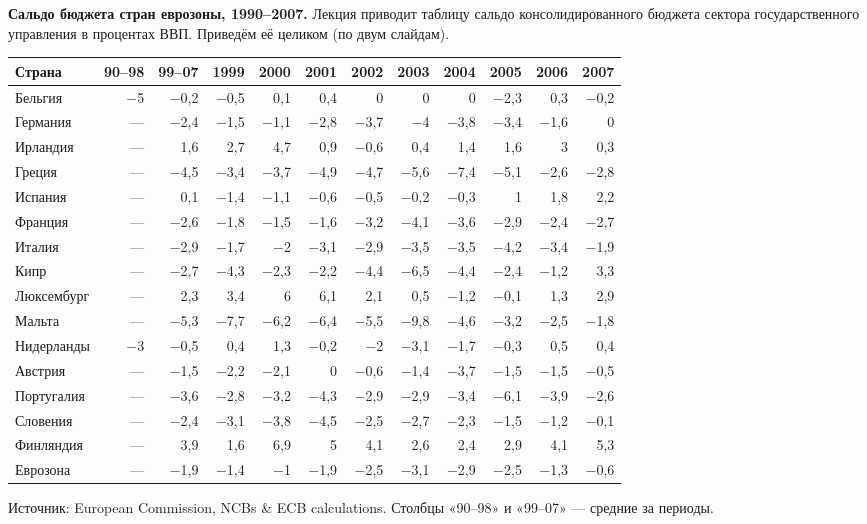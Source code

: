 \documentclass[11pt,a4paper]{article}
\begin{document}
\textbf{Сальдо бюджета стран еврозоны, 1990--2007.} Лекция приводит таблицу сальдо консолидированного бюджета сектора государственного управления в процентах ВВП. Приведём её целиком (по двум слайдам).

\begin{center}
\footnotesize
\setlength{\tabcolsep}{3.2pt}
\begin{tabular}{lrrrrrrrrrrr}
\toprule
\textbf{Страна} & \textbf{90--98} & \textbf{99--07} & \textbf{1999} & \textbf{2000} & \textbf{2001} & \textbf{2002} & \textbf{2003} & \textbf{2004} & \textbf{2005} & \textbf{2006} & \textbf{2007}\\
\midrule
Бельгия & −5 & −0,2 & −0,5 & 0,1 & 0,4 & 0 & 0 & 0 & −2,3 & 0,3 & −0,2\\
Германия & --- & −2,4 & −1,5 & −1,1 & −2,8 & −3,7 & −4 & −3,8 & −3,4 & −1,6 & 0\\
Ирландия & --- & 1,6 & 2,7 & 4,7 & 0,9 & −0,6 & 0,4 & 1,4 & 1,6 & 3 & 0,3\\
Греция & --- & −4,5 & −3,4 & −3,7 & −4,9 & −4,7 & −5,6 & −7,4 & −5,1 & −2,6 & −2,8\\
Испания & --- & 0,1 & −1,4 & −1,1 & −0,6 & −0,5 & −0,2 & −0,3 & 1 & 1,8 & 2,2\\
Франция & --- & −2,6 & −1,8 & −1,5 & −1,6 & −3,2 & −4,1 & −3,6 & −2,9 & −2,4 & −2,7\\
Италия & --- & −2,9 & −1,7 & −2 & −3,1 & −2,9 & −3,5 & −3,5 & −4,2 & −3,4 & −1,9\\
Кипр & --- & −2,7 & −4,3 & −2,3 & −2,2 & −4,4 & −6,5 & −4,4 & −2,4 & −1,2 & 3,3\\
Люксембург & --- & 2,3 & 3,4 & 6 & 6,1 & 2,1 & 0,5 & −1,2 & −0,1 & 1,3 & 2,9\\
Мальта & --- & −5,3 & −7,7 & −6,2 & −6,4 & −5,5 & −9,8 & −4,6 & −3,2 & −2,5 & −1,8\\
Нидерланды & −3 & −0,5 & 0,4 & 1,3 & −0,2 & −2 & −3,1 & −1,7 & −0,3 & 0,5 & 0,4\\
Австрия & --- & −1,5 & −2,2 & −2,1 & 0 & −0,6 & −1,4 & −3,7 & −1,5 & −1,5 & −0,5\\
Португалия & --- & −3,6 & −2,8 & −3,2 & −4,3 & −2,9 & −2,9 & −3,4 & −6,1 & −3,9 & −2,6\\
Словения & --- & −2,4 & −3,1 & −3,8 & −4,5 & −2,5 & −2,7 & −2,3 & −1,5 & −1,2 & −0,1\\
Финляндия & --- & 3,9 & 1,6 & 6,9 & 5 & 4,1 & 2,6 & 2,4 & 2,9 & 4,1 & 5,3\\
\midrule
Еврозона & --- & −1,9 & −1,4 & −1 & −1,9 & −2,5 & −3,1 & −2,9 & −2,5 & −1,3 & −0,6\\
\bottomrule
\end{tabular}

{\footnotesize Источник: European Commission, NCBs \& ECB calculations. Столбцы «90--98» и «99--07» --- средние за периоды.}
\end{center}
\end{document}

